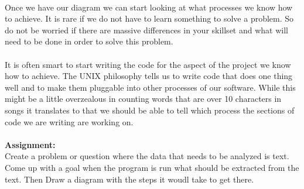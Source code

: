 \documentclass[..main.tex]{subfiles}
\begin{document}
\\
\noindent Once we have our diagram we can start looking at what processes we know how to achieve. It is rare if we do not have to learn something to solve a problem. So do not be worried if there are massive differences in your skillset and what will need to be done in order to solve this problem. \\
\\
It is often smart to start writing the code for the aspect of the project we know how to achieve. The UNIX philosophy tells us to write code that does one thing well and to make them pluggable into other processes of our software. While this might be a little overzealous in counting words that are over 10 characters in songs it translates to that we should be able to tell which process the sections of code we are writing are working on.\\
\\
\textbf{Assignment:}
\\
\noindent Create a problem or question where the data that needs to be analyzed is text. Come up with a goal when the program is run what should be extracted from the text. Then Draw a diagram with the steps it woudl take to get there.
\newpage
\end{document}
